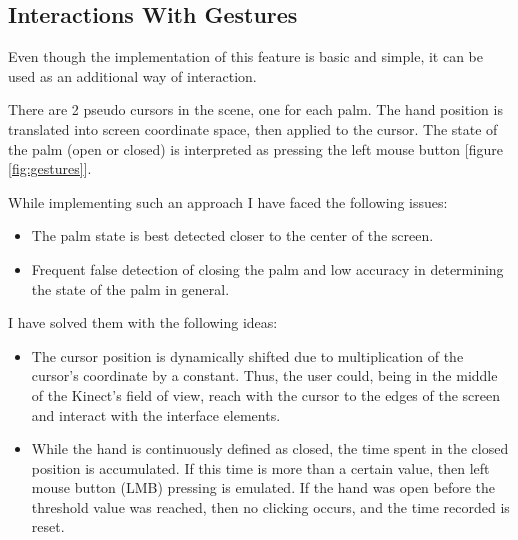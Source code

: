 \documentclass[a4paper]{report}
\begin{document}

\subsection{Interactions  With Gestures}

\qquad Even though the implementation of this feature is basic and simple, it can be used as an additional way of interaction.

There are 2 pseudo cursors in the scene, one for each palm. The hand position is translated into screen coordinate space, then applied to the cursor. The state of the palm (open or closed) is interpreted as pressing the left mouse button [figure \ref{fig:gestures}].

While implementing such an approach I have faced the following issues:

\begin{itemize}
\item The palm state is best detected closer to the center of the screen.
\item Frequent false detection of closing the palm and low accuracy in determining the state of the palm in general.
\end{itemize}

I have solved them with the following ideas:

\begin{itemize}
\item The cursor position is dynamically shifted due to multiplication of the cursor's coordinate by a constant. Thus, the user could, being in the middle of the Kinect's field of view, reach with the cursor to the edges of the screen and interact with the interface elements.
\item While the hand is continuously defined as closed, the time spent in the closed position is accumulated. If this time is more than a certain value, then left mouse button (LMB) pressing is emulated. If the hand was open before the threshold value was reached, then no clicking occurs, and the time recorded is reset.
\end{itemize}
\end{document}
